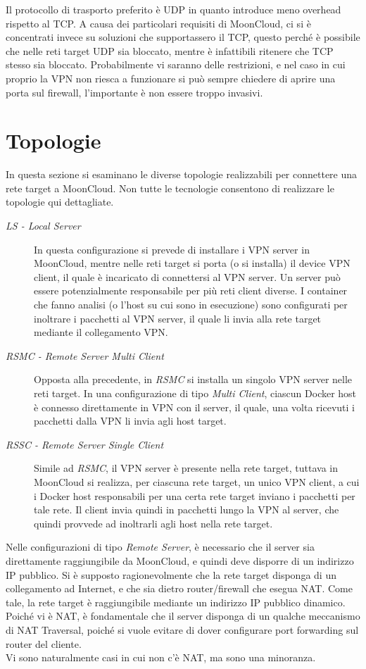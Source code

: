 Il protocollo di trasporto preferito è UDP in quanto introduce meno overhead rispetto al TCP. A causa
dei particolari requisiti di MoonCloud, ci si è concentrati invece su soluzioni che
supportassero il TCP, questo perché è possibile che nelle reti target UDP sia bloccato,
mentre è infattibili ritenere che TCP stesso sia bloccato. Probabilmente vi saranno
delle restrizioni, e nel caso in cui proprio la VPN non riesca a funzionare si può sempre
chiedere di aprire una porta sul firewall, l'importante è non essere troppo invasivi.


\section{Topologie}
In questa sezione si esaminano le diverse topologie realizzabili per connettere una rete
target a MoonCloud. Non tutte le tecnologie consentono di realizzare le topologie qui
dettagliate.
\begin{description}
  \item[\textit{LS - Local Server}]In questa configurazione si prevede di installare i
  VPN server in MoonCloud, mentre nelle reti target si porta (o si installa) il device
  VPN client, il quale è incaricato di connettersi al VPN server. Un server può essere
  potenzialmente responsabile per più reti client diverse. I container che fanno analisi
  (o l'host su cui sono in esecuzione)
  sono configurati per inoltrare i pacchetti al VPN server, il quale li invia alla rete
  target mediante il collegamento VPN.
  \item[\textit{RSMC - Remote Server Multi Client}]Opposta alla precedente, in \textit{RSMC}
  si installa un singolo VPN server nelle reti target. In una configurazione di tipo
  \textit{Multi Client}, ciascun Docker host è connesso direttamente in VPN con il server, il
  quale, una volta ricevuti i pacchetti dalla VPN li invia agli host target.
  \item[\textit{RSSC - Remote Server Single Client}]Simile ad \textit{RSMC}, il VPN
  server è presente nella rete target, tuttava in MoonCloud si realizza, per ciascuna rete
  target, un unico VPN client, a cui i Docker host responsabili per una certa rete target inviano
  i pacchetti per tale rete. Il client invia quindi in pacchetti lungo la VPN al server,
  che quindi provvede ad inoltrarli agli host nella rete target.
\end{description}
Nelle configurazioni di tipo \textit{Remote Server}, è necessario che il server sia
direttamente raggiungibile da MoonCloud, e quindi deve disporre di un indirizzo IP pubblico.
Si è supposto ragionevolmente che la rete target disponga di un collegamento ad Internet, e che
sia dietro router/firewall che esegua NAT. Come tale, la rete target è raggiungibile
mediante un indirizzo IP pubblico dinamico. Poiché vi è NAT, è fondamentale che il server disponga
di un qualche meccanismo di NAT Traversal, poiché si vuole evitare di dover configurare
port forwarding sul router del cliente.\\
Vi sono naturalmente casi in cui non c'è NAT, ma sono una minoranza.

